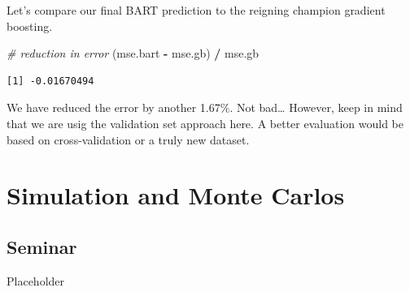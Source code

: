 \documentclass[]{article}
\newenvironment{Shaded}{\begin{snugshade}}{\end{snugshade}}
\newcommand{\CommentTok}[1]{\textcolor[rgb]{0.56,0.35,0.01}{\textit{#1}}}
\newcommand{\NormalTok}[1]{#1}
\newcommand{\OperatorTok}[1]{\textcolor[rgb]{0.81,0.36,0.00}{\textbf{#1}}}
\newcommand{\StringTok}[1]{\textcolor[rgb]{0.31,0.60,0.02}{#1}}
\begin{document}
Let's compare our final BART prediction to the reigning champion gradient boosting.

\begin{Shaded}
\begin{Highlighting}[]
\CommentTok{# reduction in error}
\NormalTok{(mse.bart }\OperatorTok{-}\StringTok{ }\NormalTok{mse.gb) }\OperatorTok{/}\StringTok{ }\NormalTok{mse.gb}
\end{Highlighting}
\end{Shaded}

\begin{verbatim}
[1] -0.01670494
\end{verbatim}

We have reduced the error by another 1.67\(\%\). Not bad\ldots{} However, keep in mind that we are usig the validation set approach here. A better evaluation would be based on cross-validation or a truly new dataset.

\hypertarget{simulation-and-monte-carlos}{%
\section{Simulation and Monte Carlos}\label{simulation-and-monte-carlos}}

\hypertarget{seminar-6}{%
\subsection{Seminar}\label{seminar-6}}

Placeholder
\end{document}
